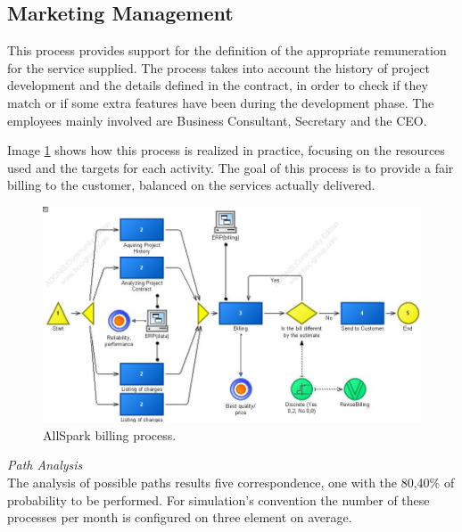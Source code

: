 %

\subsection{Marketing Management}
This process provides support for the definition of the appropriate
remuneration for the service supplied.
The process takes into account the history of project development and the details defined in the contract, in order to check if they match or if some extra features have been during the development phase. The employees mainly involved are Business Consultant, Secretary and the CEO.

Image \ref{2img:billing} shows how this process is realized in practice, focusing on the resources used and the targets for each activity. The goal of this process is to provide a fair billing to the customer, balanced on the services actually delivered.\\

\begin{figure}[ht!]
\begin{centering}
\includegraphics[scale=0.50, angle=90]{assign2/adonis/imgs/billing.jpg}
\caption{AllSpark billing process.}
\label{2img:billing}
\end{centering}
\end{figure}

\noindent
\emph{Path Analysis}\\
The analysis of possible paths results five correspondence, one with the 80,40\% of probability to be performed. For simulation's convention the number of these processes per month is configured on three element on average.

\begin{alltt}

\end{alltt}\\

